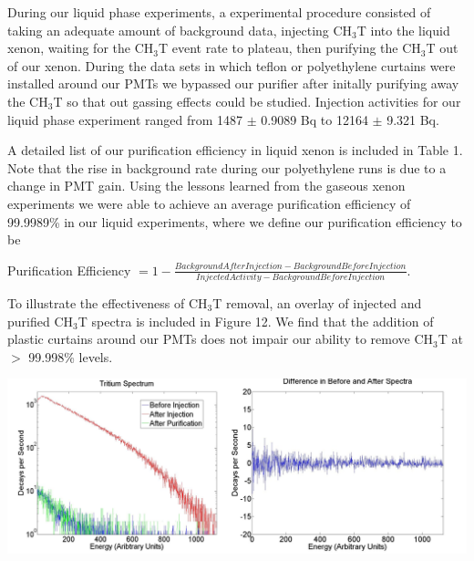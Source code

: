 \documentclass[a4paper,12pt]{article}
\begin{document}
During our liquid phase experiments, a experimental procedure consisted of taking an adequate amount of background data, injecting CH$_3$T into the liquid xenon, waiting for the CH$_3$T event rate to plateau, then purifying the CH$_3$T out of our xenon.  During the data sets in which teflon or polyethylene curtains were installed around our PMTs we bypassed our purifier after initally purifying away the CH$_3$T so that out gassing effects could be studied.  Injection activities for our liquid phase experiment ranged from 1487 $\pm$ 0.9089 Bq to 12164 $\pm$ 9.321 Bq.  

A detailed list of our purification efficiency in liquid xenon is included in Table 1.  Note that the rise in background rate during our polyethylene runs is due to a change in PMT gain.  Using the lessons learned from the gaseous xenon experiments we were able to achieve an average purification efficiency of 99.9989\% in our liquid experiments, where we define our purification efficiency to be

\begin{center}
Purification Efficiency $= 1 - \frac{Background After Injection - Background Before Injection}{Injected Activity - Background Before Injection}.$
\end{center}

To illustrate the effectiveness of CH$_3$T removal, an overlay of injected and purified CH$_3$T spectra is included in Figure 12.  We find that the addition of plastic curtains around our PMTs does not impair our ability to remove CH$_3$T at $>$ 99.998\% levels.

\begin{center}
\includegraphics[scale=0.5]{spectra.png}
\end{center}
\end{document}
